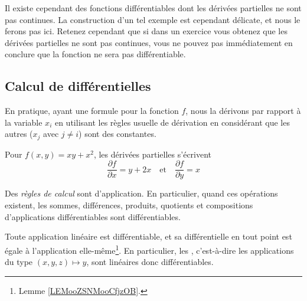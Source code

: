 \begin{remark}
	Il existe cependant des fonctions différentiables dont les dérivées partielles ne sont pas continues. La construction d'un tel exemple est cependant délicate, et nous le ferons pas ici. Retenez cependant que si dans un exercice vous obtenez que les dérivées partielles ne sont pas continues, vous ne pouvez pas immédiatement en conclure que la fonction ne sera pas différentiable.
\end{remark}

\subsection{Calcul de différentielles}

\begin{normaltext} \label{deriveepartielles}
	En pratique, ayant une formule pour la fonction $f$, nous la dérivons par rapport à la variable $x_i$ en utilisant les règles usuelle de dérivation en considérant que les autres ($x_j$ avec $j \neq i$) sont des constantes.
\end{normaltext}

\begin{example}Pour $f(x,y) = xy + x^2$, les dérivées partielles
	s'écrivent
	\begin{equation*}
		\frac{\partial f}{\partial x} = y + 2x \quad\text{et}\quad \frac{\partial f}{\partial y} = x
	\end{equation*}
\end{example}


Des \emph{règles de calcul} sont d'application. En particulier, quand
ces opérations existent, les sommes, différences, produits, quotients
et compositions d'applications différentiables sont différentiables.

Toute application linéaire est différentiable, et sa différentielle en
tout point est égale à l'application elle-même\footnote{Lemme \ref{LEMooZSNMooCfjzOB}.}. En particulier, les
, c'est-à-dire les applications du type
$(x,y,z) \mapsto y$, sont linéaires donc différentiables.

